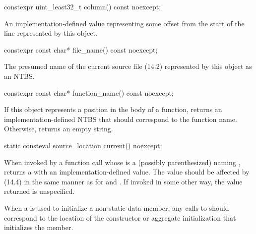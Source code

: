\documentclass[a4paper,article]{article}
\begin{document}
\begin{itemdecl}
constexpr uint_least32_t column() const noexcept;
\end{itemdecl}
\begin{itemdescr}
\pnum
\returns
An implementation-defined value representing some offset from the start of the line represented by this object.
\end{itemdescr}

\begin{itemdecl}
constexpr const char* file_name() const noexcept;
\end{itemdecl}
\begin{itemdescr}
\pnum
\returns
The presumed name of the current source file (14.2) represented by this object as an NTBS.
\end{itemdescr}

\begin{itemdecl}
constexpr const char* function_name() const noexcept;
\end{itemdecl}
\begin{itemdescr}
\pnum
\returns
If this object represents a position in the body of a function, returns an implementation-defined NTBS that should correspond to the function name.  Otherwise, returns an empty string.

\end{itemdescr}

\begin{itemdecl}
static consteval source_location current() noexcept;
\end{itemdecl}
\begin{itemdescr}
\pnum
\returns
When invoked by a function call whose  is a (possibly parenthesized)  naming , returns a  with an implementation-defined value. The value should be affected by  (14.4) in the same manner as for  and . If invoked in some other way, the value returned is unspecified.
\end{itemdescr}
\begin{itemdescr}
\pnum
\note
When a  is used to initialize a non-static data member, any calls to  should correspond to the location of the constructor or aggregate initialization that initializes the member.



\end{itemdescr}
\end{document}
